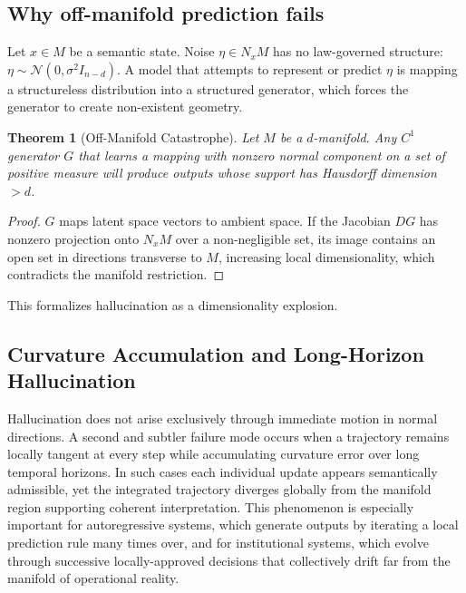 \documentclass[11pt,a4paper,twocolumn]{article}
\newtheorem{theorem}{Theorem}[section]
\begin{document}
\subsection{Why off-manifold prediction fails}

Let $x \in M$ be a semantic state. Noise $\eta \in N_x M$ has no
law-governed structure: $\eta \sim \mathcal{N}(0,\sigma^2 I_{n-d})$.
A model that attempts to represent or predict $\eta$ is mapping a
structureless distribution into a structured generator, which forces the
generator to create non-existent geometry.

\begin{theorem}[Off-Manifold Catastrophe]
Let $M$ be a $d$-manifold. Any $C^1$ generator $G$ that learns a
mapping with nonzero normal component on a set of positive measure will
produce outputs whose support has Hausdorff dimension $> d$.
\end{theorem}

\begin{proof}
$G$ maps latent space vectors to ambient space. If the Jacobian $DG$
has nonzero projection onto $N_x M$ over a non-negligible set, its
image contains an open set in directions transverse to $M$, increasing
local dimensionality, which contradicts the manifold restriction.
\end{proof}

This formalizes hallucination as a dimensionality explosion.

\subsection{Curvature Accumulation and Long-Horizon Hallucination}

Hallucination does not arise exclusively through immediate motion in
normal directions. A second and subtler failure mode occurs when a
trajectory remains locally tangent at every step while accumulating
curvature error over long temporal horizons. In such cases each
individual update appears semantically admissible, yet the integrated
trajectory diverges globally from the manifold region supporting
coherent interpretation. This phenomenon is especially important for
autoregressive systems, which generate outputs by iterating a local
prediction rule many times over, and for institutional systems, which
evolve through successive locally-approved decisions that collectively
drift far from the manifold of operational reality.
\end{document}
